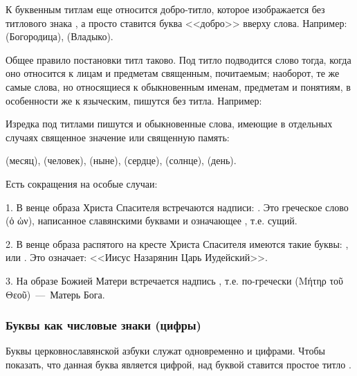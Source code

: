 \documentclass[11pt,a4paper,oneside]{memoir}
\begin{document}
    К буквенным титлам еще относится добро-титло, которое изображается без титлового знака {}, а просто ставится буква <<добро>> вверху слова. Например: {} (Богородица), {} (Владыко).
    
    Общее правило постановки титл таково. Под титло подводится слово тогда, когда оно относится к лицам и предметам священным, почитаемым; наоборот, те же самые слова, но относящиеся к обыкновенным именам, предметам и понятиям, в особенности же к языческим, пишутся без титла. Например:

    \bigskip{}

    Изредка под титлами пишутся и обыкновенные слова, имеющие в отдельных случаях священное значение или священную память:
    
    {} (месяц), {} (человек), {} (ныне), {} (сердце), {} (солнце), {} (день).
    
    Есть сокращения на особые случаи:
    
    1. В венце образа Христа Спасителя встречаются надписи: {}. Это греческое слово (\textgreek{ὁ ὠν}), написанное славянскими буквами и означающее {}, т.е. сущий.
    
    2. В венце образа распятого на кресте Христа Спасителя имеются такие буквы: {}, или {}. Это означает: <<Иисус Назарянин Царь Иудейский>>.
    
    3. На образе Божией Матери встречается надпись {}, т.е. по-гречески (\textgreek{Μήτηρ τοῦ Θεοῦ})~---~Матерь Бога.
        
                \subsubsection{Буквы как числовые знаки (цифры)}

    Буквы церковнославянской азбуки служат одновременно и цифрами. Чтобы показать, что данная буква является цифрой, над буквой ставится простое титло {}.
\end{document}
